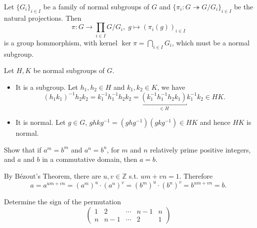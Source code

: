 \begin{solution}
    Let $\{G_{i}\}_{i\in I}$ be a family of normal subgroups of $G$ and $\{\pi_{i}\colon G\twoheadrightarrow G/G_{i}\}_{i\in I}$ 
    be the natural projections. Then 
        \[
            \pi\colon G \to \prod_{i\in I}G/G_{i},\; g\mapsto (\pi_{i}(g))_{i\in I}
        \]
    is a group hommorphism, with kernel $\ker\pi=\bigcap_{i\in I}G_{i}$, which must be a normal subgroup.
\par Let $H,K$ be normal subgroups of $G$. 
    \begin{itemize}
        \item It is a subgroup. Let $h_{1},h_{2}\in H$ and $k_{1},k_{2}\in K$, we have
            \[
                (h_{1}k_{1})^{-1}h_{2}k_{2}=k_{1}^{-1}h_{1}^{-1}h_{2}k_{2}=\underbracket{(k_{1}^{-1}h_{1}^{-1}h_{2}k_{1})}_{\in H}k_{1}^{-1}k_{2}\in H K.
            \]
        \item It is normal. Let $g\in G$, $g h k g^{-1}=(g h g^{-1}) (g k g^{-1})\in H K$ and hence $H K$ is normal.
    \end{itemize}
\end{solution}

\setcounter{pb}{15}
\begin{problem}
    Show that if $ a^m = b^m $ and $ a^n = b^n $, for $ m $ and $ n $ relatively prime positive integers, and $ a $ and $ b $ in a commutative domain, then $ a = b $.
\end{problem}

\begin{solution}
    By B\'ezout's Theorem, there are $ u,v\in\mathbb{Z}$ s.t. $u m+v n=1$. Therefore
        \[
            a=a^{u m+v n}=(a^{m})^{u}\cdot(a^{n})^{v}=(b^{m})^{u}\cdot(b^{n})^{v}=b^{u m+v n}=b.
        \]
\end{solution}

\setcounter{pb}{16}
\begin{problem}
    Determine the sign of the permutation   
    \[
    \begin{pmatrix}
    1 & 2 & \cdots & n-1 & n \\
    n & n-1 & \cdots & 2 & 1
    \end{pmatrix}
    \]
\end{problem}

